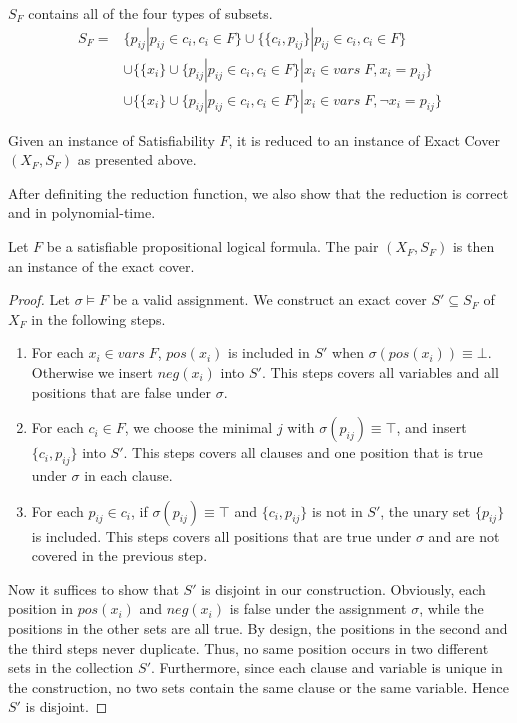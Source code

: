 $S_F$ contains all of the four types of subsets.
\begin{align*}
    S_F =& \{{p_{ij}} | p_{ij} \in c_i, c_i \in F \} 
    \cup \{\{c_i, p_{ij}\} | p_{ij} \in c_i, c_i \in F \} \\
    &\cup \{\{x_i\} \cup \{p_{ij} | p_{ij} \in c_i, c_i \in F\} | x_i \in vars\; F, x_i = p_{ij}\}\\
    &\cup \{\{x_i\} \cup \{p_{ij} | p_{ij} \in c_i, c_i \in F\} | x_i \in vars\; F, \neg x_i = p_{ij}\}
\end{align*}
\begin{definition}
    Given an instance of Satisfiability $F$, 
    it is reduced to an instance of Exact Cover $(X_F, S_F)$ as presented above.
\end{definition}
After definiting the reduction function,
we also show that the reduction is correct and in polynomial-time.
\begin{lemma}[Soundess]
    Let $F$ be a satisfiable propositional logical formula. The pair $(X_F, S_F)$ is then an instance of the exact cover.
\end{lemma}
\begin{proof}
    Let $\sigma \models F$ be a valid assignment. We construct an exact cover $S' \subseteq S_F$ of $X_F$ in the following steps.
\begin{enumerate}
    \item For each $x_i \in vars\; F$, $pos(x_i)$ is included in $S'$ when $\sigma(pos(x_i)) \equiv \bot$. Otherwise we insert $neg(x_i)$ into $S'$.
    This steps covers all variables and all positions that are false under $\sigma$.
    \item For each $c_i \in F$, we choose the minimal $j$ with $\sigma(p_{ij}) \equiv \top$, and insert $\{c_i, p_{ij}\}$ into $S'$.
    This steps covers all clauses and one position that is true under $\sigma$ in each clause.
    \item For each $p_{ij} \in c_i$, if $\sigma(p_{ij}) \equiv \top$ and $\{c_i, p_{ij}\}$ is not in $S'$, the unary set $\{p_{ij}\}$ is included. 
    This steps covers all positions that are true under $\sigma$ and are not covered in the previous step.
\end{enumerate}
Now it suffices to show that $S'$ is disjoint in our construction.
Obviously, each position in $pos(x_i)$ and $neg(x_i)$ is false under the assignment $\sigma$, 
while the positions in the other sets are all true. By design, the positions in the second and the third steps never duplicate. 
Thus, no same position occurs in two different sets in the collection $S'$. 
Furthermore, since each clause and variable is unique in the construction, no two sets contain the same clause or the same variable.
Hence $S'$ is disjoint.
\end{proof}
